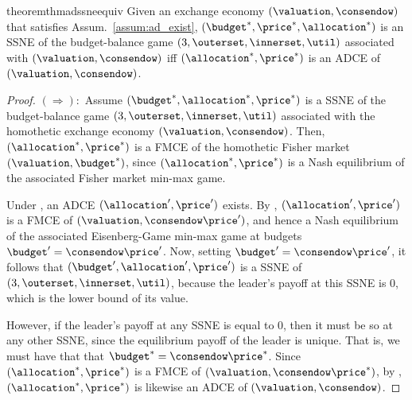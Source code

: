 \begin{restatable}{theorem}{thmadssneequiv}
\label{thm:ad_ssne_equiv}
Given an exchange economy $(\valuation, \consendow)$ that satisfies Assum.~\ref{assum:ad_exist},
$(\budget^*, \price^*, \allocation^*)$ is an SSNE of the budget-balance game $(3, \outerset, \innerset, \util)$ associated with $(\valuation, \consendow)$ iff $(\allocation^*, \price^*)$ is an ADCE of $(\valuation, \consendow)$. 
\end{restatable}
\begin{proof}
    $(\Rightarrow):$ Assume $(\budget^*, \allocation^*, \price^*)$ is a SSNE of the budget-balance game $(3, \outerset, \innerset, \util)$ associated with the homothetic exchange economy $(\valuation, \consendow)$. 
    Then, $(\allocation^*, \price^*)$ is a FMCE of the homothetic Fisher market $(\valuation, \budget^*)$, since $(\allocation^*, \price^*)$ is a Nash equilibrium of the associated Fisher market min-max game. 
    
    
    Under , an ADCE $(\allocation^\prime, \price^\prime)$ exists.
    By , $(\allocation^\prime, \price^\prime)$ is a FMCE of $(\valuation, \consendow \price^\prime)$, and hence a Nash equilibrium of the associated Eisenberg-Game min-max game at budgets $\budget^\prime = \consendow \price^\prime$.
    Now, setting $\budget^\prime = \consendow \price^\prime$, it follows that $(\budget^\prime, \allocation^\prime, \price^\prime)$ is a SSNE of $(3, \outerset, \innerset, \util)$, because the leader's payoff at this SSNE is $0$, which is the lower bound of its value.
    
    However, if the leader's payoff at any SSNE is equal to 0, then it must be so at any other SSNE, since the equilibrium payoff of the leader is unique. That is, we must have that that $\budget^* = \consendow \price^*$. Since $(\allocation^*, \price^*)$ is a FMCE of $(\valuation, \consendow \price^*)$, by , $(\allocation^*, \price^*)$ is likewise an ADCE of $(\valuation, \consendow)$.


\end{proof}
